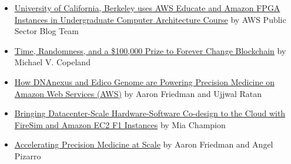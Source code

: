 \documentclass[a4paper]{article}
\begin{document}
    \begin{itemize}
        \item \href{https://aws.amazon.com/blogs/publicsector/university-of-berkeley-uses-aws-educate-for-amazon-fpga-accelerator-development-and-deployment-in-the-cloud/}{University of California, Berkeley uses AWS Educate and Amazon FPGA Instances in Undergraduate Computer Architecture Course} by AWS Public Sector Blog Team

        \item \href{https://aws.amazon.com/blogs/startups/competition-forever-change-blockchain/}{Time, Randomness, and a \$100,000 Prize to Forever Change Blockchain} by Michael V. Copeland

        \item \href{https://aws.amazon.com/blogs/apn/how-dnanexus-and-edico-genome-are-powering-precision-medicine-on-amazon-web-services-aws/}{How DNAnexus and Edico Genome are Powering Precision Medicine on Amazon Web Services (AWS)} by Aaron Friedman and Ujjwal Ratan

        \item \href{https://aws.amazon.com/blogs/compute/bringing-datacenter-scale-hardware-software-co-design-to-the-cloud-with-firesim-and-amazon-ec2-f1-instances/}{Bringing Datacenter-Scale Hardware-Software Co-design to the Cloud with FireSim and Amazon EC2 F1 Instances} by Mia Champion

        \item \href{https://aws.amazon.com/blogs/compute/accelerating-precision-medicine-at-scale/}{Accelerating Precision Medicine at Scale} by Aaron Friedman and Angel Pizarro
    \end{itemize}
\end{document}

